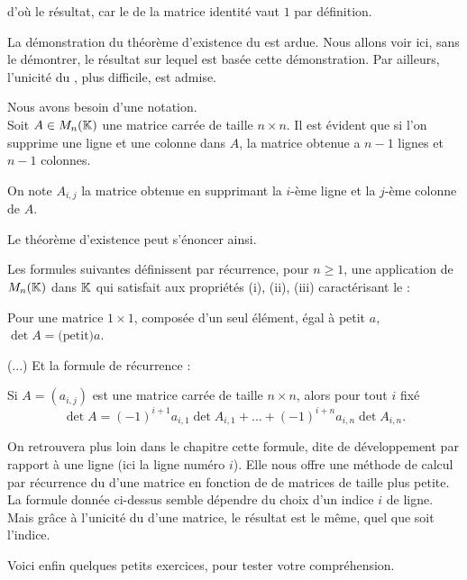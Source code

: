 \change
d'où le résultat, car le \deter de la matrice identité vaut $1$ par définition.


\diapo
La démonstration du théorème d'existence du \deter est ardue. Nous allons voir ici, 
sans le démontrer, le résultat sur lequel est basée cette démonstration. 
Par ailleurs, l'unicité du \deter, plus difficile, est admise.

Nous avons besoin d'une notation. \\
Soit $A \in M_n(\mathbb{K})$ une matrice carrée de taille $n \times n$. 
Il est évident que si l'on supprime une ligne et une colonne dans $A$, 
la matrice obtenue a $n-1$ lignes et $n-1$ colonnes. 

\change
On note $A_{i,j}$ la matrice obtenue en supprimant la $i$-ème ligne et la $j$-ème
colonne de $A$. 


\change
Le théorème d'existence peut s'énoncer ainsi.

Les formules suivantes définissent par récurrence, pour $n\ge 1$, 
une application de $M_n(\mathbb{K})$ dans $\mathbb{K}$ qui satisfait aux propriétés
(i), (ii), (iii) caractérisant le \deter :

\change
Pour une matrice $1\times 1$, composée d'un seul élément, égal à petit $a$, $\det A = \text{(petit)} a$.
  
\change
(...)
\newpage
Et la formule de récurrence :

Si $A=(a_{i,j})$ est une matrice carrée de taille $n \times n$, alors pour tout $i$ fixé
$$\det A = (-1)^{i+1}a_{i,1}\det A_{i,1} +\dots + (-1)^{i+n}a_{i,n}\det A_{i,n}.$$  

On retrouvera plus loin dans le chapitre cette formule, 
dite de développement par rapport à une ligne (ici la ligne numéro $i$). 
Elle nous offre une méthode de calcul par récurrence du \deter d'une matrice
en fonction de \deters de matrices de taille plus petite.
\\

La formule donnée ci-dessus semble dépendre du choix d'un indice $i$ de ligne. 
Mais grâce à l'unicité du \deter d'une matrice, le résultat est le même, quel que soit l'indice.   


\diapo

Voici enfin quelques petits exercices, pour tester votre compréhension. 


